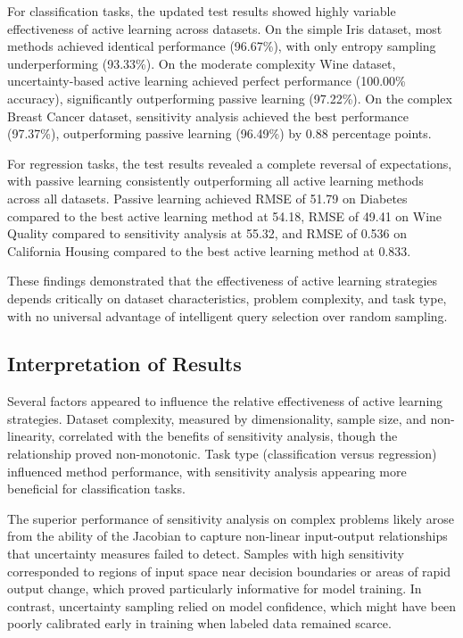 \documentclass[conference]{IEEEtran}
\begin{document}
For classification tasks, the updated test results showed highly variable effectiveness of active learning across datasets. On the simple Iris dataset, most methods achieved identical performance (96.67\%), with only entropy sampling underperforming (93.33\%). On the moderate complexity Wine dataset, uncertainty-based active learning achieved perfect performance (100.00\% accuracy), significantly outperforming passive learning (97.22\%). On the complex Breast Cancer dataset, sensitivity analysis achieved the best performance (97.37\%), outperforming passive learning (96.49\%) by 0.88 percentage points.

For regression tasks, the test results revealed a complete reversal of expectations, with passive learning consistently outperforming all active learning methods across all datasets. Passive learning achieved RMSE of 51.79 on Diabetes compared to the best active learning method at 54.18, RMSE of 49.41 on Wine Quality compared to sensitivity analysis at 55.32, and RMSE of 0.536 on California Housing compared to the best active learning method at 0.833.

These findings demonstrated that the effectiveness of active learning strategies depends critically on dataset characteristics, problem complexity, and task type, with no universal advantage of intelligent query selection over random sampling.

\subsection{Interpretation of Results}

Several factors appeared to influence the relative effectiveness of active learning strategies. Dataset complexity, measured by dimensionality, sample size, and non-linearity, correlated with the benefits of sensitivity analysis, though the relationship proved non-monotonic. Task type (classification versus regression) influenced method performance, with sensitivity analysis appearing more beneficial for classification tasks.

The superior performance of sensitivity analysis on complex problems likely arose from the ability of the Jacobian to capture non-linear input-output relationships that uncertainty measures failed to detect. Samples with high sensitivity corresponded to regions of input space near decision boundaries or areas of rapid output change, which proved particularly informative for model training. In contrast, uncertainty sampling relied on model confidence, which might have been poorly calibrated early in training when labeled data remained scarce.
\end{document}

